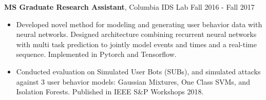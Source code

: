 \documentclass{article} %
\newcommand{\rjob}[2]{
  \hspace*{-0.3cm}
{\fontsize{10pt}{12pt}\selectfont #1} \hfill #2
\vspace*{0.1cm}
\hspace*{-1.2cm}
}
\newenvironment{ritemize}{
\hspace*{-0.8cm}
\begin{minipage}{1.05\linewidth}
\begin{itemize}
}{
\end{itemize}
\end{minipage}
}
\newcommand{\ritem}{
\item[-]
}
\begin{document}
\rjob{\textbf{MS Graduate Research Assistant}, Columbia IDS Lab}{Fall 2016 - Fall 2017}\\
\begin{ritemize}
  \ritem Developed novel method for modeling and generating user behavior data with neural networks. Designed architecture combining recurrent neural networks with multi task prediction to jointly model events and times and a real-time sequence. Implemented in Pytorch and Tensorflow.
    \ritem Conducted evaluation on Simulated User Bots (SUBs), and simulated attacks against 3 user behavior models: Gaussian Mixtures, One Class SVMs, and Isolation Forests. Published in IEEE S\&P Workshops 2018.
\end{ritemize}



\end{document}
